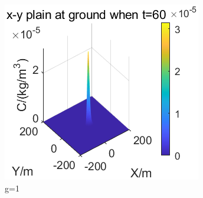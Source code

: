 \documentclass{article}
\begin{document}
\begin{figure}[htbp]
		\begin{minipage}{0.33\textwidth}
			\includegraphics[width=\textwidth]{pics/g=1,t=90.png}
		\end{minipage}
		\caption{g=1}
		\label{fig25}
	\end{figure}
\end{document}
